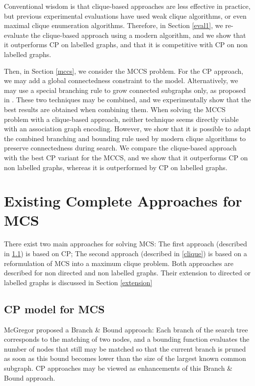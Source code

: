 \documentclass{llncs}
\begin{document}
Conventional wisdom is that clique-based approaches are less effective in practice, but previous experimental evaluations have used weak clique algorithms, or even maximal clique enumeration algorithms. 
Therefore, in Section \ref{eval1}, we  re-evaluate the clique-based approach using a modern algorithm, and we show that it outperforms CP on labelled graphs, and that it is competitive with CP on non labelled graphs. 

Then, in Section \ref{mccs}, we consider the MCCS problem. For the CP approach, we may add a global connectedness constraint to the model. Alternatively, we may use a special branching rule to grow connected subgraphs only, as proposed in \cite{DBLP:conf/mco/VismaraV08}. These two techniques may be combined, and we experimentally show that the best results are obtained when combining them. 
When solving the MCCS problem with a clique-based approach, neither technique seems directly viable with an association graph encoding.
However, we show that it is possible to adapt the combined branching and bounding rule used by modern clique algorithms to preserve connectedness during search.
We compare the clique-based approach with the best CP variant for the MCCS, and we show that it outperforms CP on non labelled graphs, whereas it is outperformed by CP on labelled graphs.


\section{Existing Complete Approaches for MCS}\label{existing}


There exist two main approaches for solving MCS: The first approach (described in \ref{CP}) is based on CP; The second approach (described in \ref{clique}) is based on a reformulation of MCS into a maximum clique problem. Both approaches are described for non directed and non labelled graphs. Their extension to directed or labelled graphs is discussed in Section \ref{extension}

\subsection{CP model for MCS}
\label{CP}

McGregor \cite{McGreg82} proposed a Branch \& Bound approach: Each branch of the search tree corresponds to the matching of two nodes, and a  bounding function evaluates the number of nodes that still may be matched so that the current branch is pruned as soon as this bound becomes lower than the size of the largest known common subgraph. CP approaches may be viewed as enhancements of this Branch \& Bound approach. 
\end{document}
